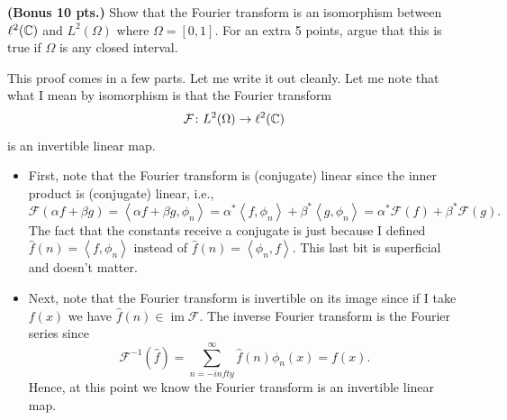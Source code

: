 \documentclass[12pt]{article} %
\newcommand{\innprod}[2]{\left\langle #1, #2\right\rangle}
\begin{document}
\newpage
\begin{problem}
\textbf{(Bonus 10 pts.)} Show that the Fourier transform is an isomorphism between $\ell^2(\mathbb{C})$ and $L^2(\Omega)$ where $\Omega=[0,1]$. For an extra 5 points, argue that this is true if $\Omega$ is any closed interval.
\end{problem}
\begin{solution}
This proof comes in a few parts. Let me write it out cleanly. Let me note that what I mean by isomorphism is that the Fourier transform
\[
\mathcal{F}\colon L^2(\Omega) \to \ell^2(\mathbb{C})
\]
is an invertible linear map.
\begin{itemize}
\item First, note that the Fourier transform is (conjugate) linear since the inner product is (conjugate) linear, i.e.,
\[
\mathcal{F}(\alpha f+ \beta g) = \innprod{\alpha f + \beta g}{\phi_n} = \alpha^* \innprod{f}{\phi_n} + \beta^* \innprod{g}{\phi_n} = \alpha^* \mathcal{F}(f) + \beta^* \mathcal{F}(g).
\]
The fact that the constants receive a conjugate is just because I defined $\hat{f}(n)= \innprod{f}{\phi_n}$ instead of $\hat{f}(n)=\innprod{\phi_n}{f}$. This last bit is superficial and doesn't matter.

\item Next, note that the Fourier transform is invertible on its image since if I take $f(x)$ we have $\hat{f}(n) \in \operatorname{im}\mathcal{F}$. The inverse Fourier transform is the Fourier series since
\[
\mathcal{F}^{-1}(\hat{f}) = \sum_{n=-infty}^\infty \hat{f}(n) \phi_n(x) = f(x).
\]
Hence, at this point we know the Fourier transform is an invertible linear map.


\end{itemize}
\end{solution}
\end{document}
